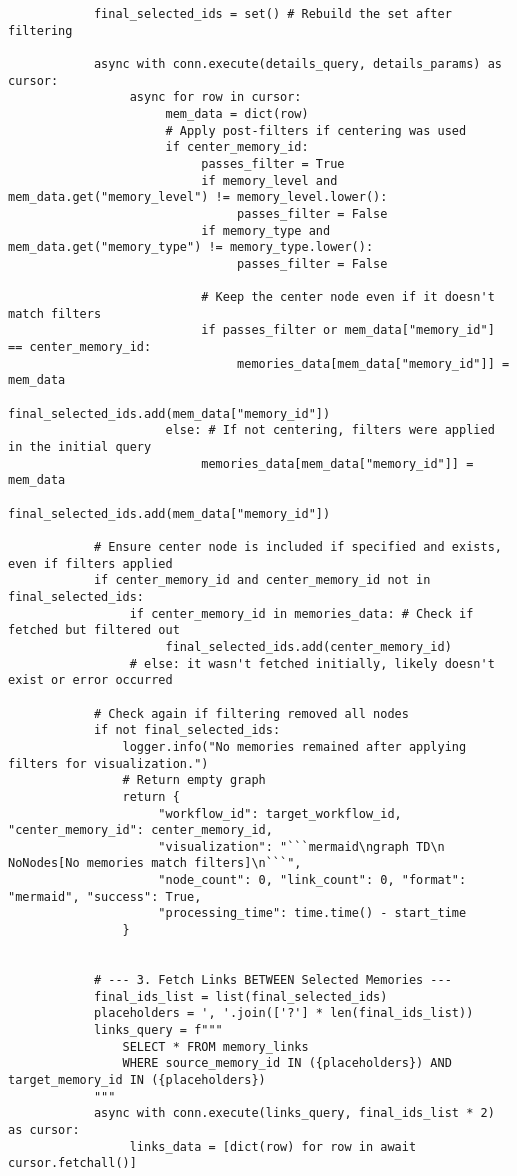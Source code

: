 \documentclass[12pt,a4paper]{article}
\begin{document}
\begin{pageablecode}
\begin{verbatim}
            final_selected_ids = set() # Rebuild the set after filtering

            async with conn.execute(details_query, details_params) as cursor:
                 async for row in cursor:
                      mem_data = dict(row)
                      # Apply post-filters if centering was used
                      if center_memory_id:
                           passes_filter = True
                           if memory_level and mem_data.get("memory_level") != memory_level.lower():
                                passes_filter = False
                           if memory_type and mem_data.get("memory_type") != memory_type.lower():
                                passes_filter = False
                           
                           # Keep the center node even if it doesn't match filters
                           if passes_filter or mem_data["memory_id"] == center_memory_id:
                                memories_data[mem_data["memory_id"]] = mem_data
                                final_selected_ids.add(mem_data["memory_id"])
                      else: # If not centering, filters were applied in the initial query
                           memories_data[mem_data["memory_id"]] = mem_data
                           final_selected_ids.add(mem_data["memory_id"])
            
            # Ensure center node is included if specified and exists, even if filters applied
            if center_memory_id and center_memory_id not in final_selected_ids:
                 if center_memory_id in memories_data: # Check if fetched but filtered out
                      final_selected_ids.add(center_memory_id)
                 # else: it wasn't fetched initially, likely doesn't exist or error occurred

            # Check again if filtering removed all nodes
            if not final_selected_ids:
                logger.info("No memories remained after applying filters for visualization.")
                # Return empty graph
                return {
                     "workflow_id": target_workflow_id, "center_memory_id": center_memory_id,
                     "visualization": "```mermaid\ngraph TD\n    NoNodes[No memories match filters]\n```",
                     "node_count": 0, "link_count": 0, "format": "mermaid", "success": True,
                     "processing_time": time.time() - start_time
                }


            # --- 3. Fetch Links BETWEEN Selected Memories ---
            final_ids_list = list(final_selected_ids)
            placeholders = ', '.join(['?'] * len(final_ids_list))
            links_query = f"""
                SELECT * FROM memory_links
                WHERE source_memory_id IN ({placeholders}) AND target_memory_id IN ({placeholders})
            """
            async with conn.execute(links_query, final_ids_list * 2) as cursor:
                 links_data = [dict(row) for row in await cursor.fetchall()]


\end{verbatim}
\end{pageablecode}
\end{document}
